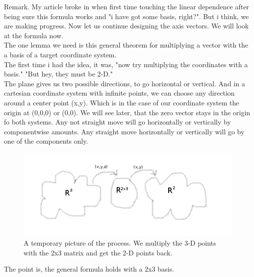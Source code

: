 \documentclass[a4paper]{article}
\begin{document}
\begin{Example}
Remark. My article broke in when first time touching the linear dependence after being sure this formula works and "i have got some basis, right?". But i think, we are making progress. Now let us continue designing the axis vectors. We will look at the formula now.\\

The one lemma we need is this general theorem for multiplying a vector with the a basis of a target coordinate system.\\

The first time i had the idea, it was, "now try multiplying the coordinates with a basis." "But hey, they must be 2-D."\\

The plane gives us two possible directions, to go horizontal or vertical. And in a cartesian coordinate system with infinite points, we can choose any direction around a center point (x,y). Which is in the case of our coordinate system the origin at (0,0,0) or (0,0). We will see later, that the zero vector stays in the origin fo both systems.
Any not straight move will go horizontally or vertically by componentwise amounts. Any straight move horizontally or vertically will go by one of the components only.\\

\begin{figure}
\includegraphics{mediator.png}
\caption{A temporary picture of the process. We multiply the 3-D points with the 2x3 matrix and get the 2-D points back.}
\end{figure}

The point is, the general formula holds with a 2x3 basis.\\

\\


\end{Example}
\end{document}
